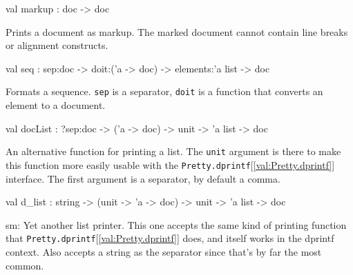 \documentclass[11pt]{article}
\begin{document}
\label{val:Pretty.markup}\begin{ocamldoccode}
val markup : doc -> doc
\end{ocamldoccode}
\begin{ocamldocdescription}
Prints a document as markup. The marked document cannot contain line 
 breaks or alignment constructs.


\end{ocamldocdescription}




\label{val:Pretty.seq}\begin{ocamldoccode}
val seq : sep:doc -> doit:('a -> doc) -> elements:'a list -> doc
\end{ocamldoccode}
\begin{ocamldocdescription}
Formats a sequence. {\tt{sep}} is a separator, {\tt{doit}} is a function that 
 converts an element to a document.


\end{ocamldocdescription}




\label{val:Pretty.docList}\begin{ocamldoccode}
val docList : ?sep:doc -> ('a -> doc) -> unit -> 'a list -> doc
\end{ocamldoccode}
\begin{ocamldocdescription}
An alternative function for printing a list. The {\tt{unit}} argument is there 
 to make this function more easily usable with the {\tt{Pretty.dprintf}}[\ref{val:Pretty.dprintf}] 
 interface. The first argument is a separator, by default a comma.


\end{ocamldocdescription}




\label{val:Pretty.d-underscorelist}\begin{ocamldoccode}
val d_list : string -> (unit -> 'a -> doc) -> unit -> 'a list -> doc
\end{ocamldoccode}
\begin{ocamldocdescription}
sm: Yet another list printer.  This one accepts the same kind of
 printing function that {\tt{Pretty.dprintf}}[\ref{val:Pretty.dprintf}] does, and itself works 
 in the dprintf context.  Also accepts
 a string as the separator since that's by far the most common.


\end{ocamldocdescription}
\end{document}
